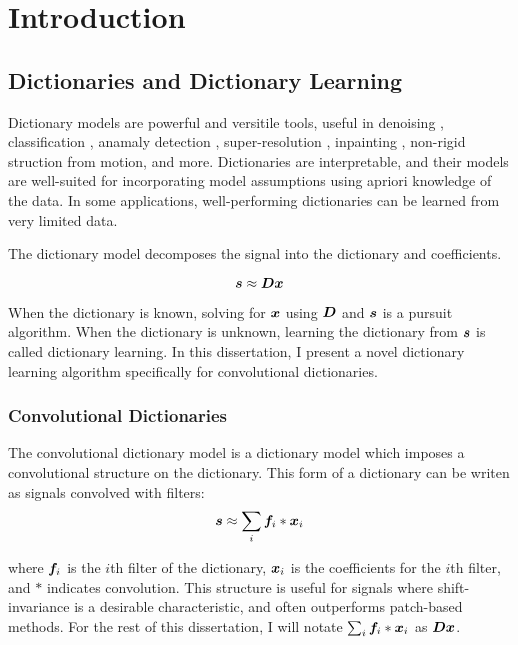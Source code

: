 \chapter{Introduction}


\section{Dictionaries and Dictionary Learning}
Dictionary models are powerful and versitile tools, useful in denoising \cite{wohlberg2016convolutional}, classification \cite{kong2012dictionary}, anamaly detection \cite{carroll2017outlier}, super-resolution \cite{polatkan2014bayesian}\cite{gu2015convolutional}, inpainting \cite{papyan2017convolutional}, non-rigid struction from motion, and more. Dictionaries are interpretable, and their models are well-suited for incorporating model assumptions using apriori knowledge of the data. In some applications, well-performing dictionaries can be learned from very limited data.

The dictionary model decomposes the signal into the dictionary and coefficients.

\begin{equation}
\bm{s} \approx \bm{D}\bm{x}
\end{equation}

When the dictionary is known, solving for $\bm{x}$ using $\bm{D}$ and $\bm{s}$ is a pursuit algorithm. When the dictionary is unknown, learning the dictionary from $\bm{s}$ is called dictionary learning. In this dissertation, I present a novel dictionary learning algorithm specifically for convolutional dictionaries.

\subsection{Convolutional Dictionaries}
The convolutional dictionary model is a dictionary model which imposes a convolutional structure on the dictionary. This form of a dictionary can be writen as signals convolved with filters:
\begin{equation}
\bm{s} \approx \sum_i \bm{f}_i * \bm{x}_i
\end{equation}

where $\bm{f}_i$ is the $i$th filter of the dictionary, $\bm{x}_i$ is the coefficients for the $i$th filter, and $*$ indicates convolution. This structure is useful for signals where shift-invariance is a desirable characteristic, and often outperforms patch-based methods. For the rest of this dissertation, I will notate $\sum_i \bm{f}_i * \bm{x}_i$ as $\bm{D}\bm{x}$.

